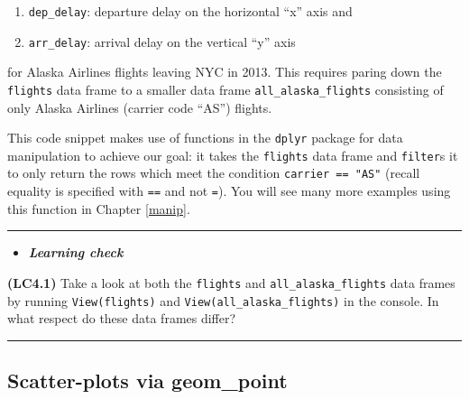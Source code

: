 \documentclass[]{tufte-book}
\newenvironment{Shaded}{\begin{snugshade}}{\end{snugshade}}
\newcommand{\KeywordTok}[1]{\textcolor[rgb]{0.13,0.29,0.53}{\textbf{{#1}}}}
\newcommand{\StringTok}[1]{\textcolor[rgb]{0.31,0.60,0.02}{{#1}}}
\newcommand{\NormalTok}[1]{{#1}}
\let\oldrule=\rule
\renewcommand{\rule}[1]{\oldrule{\linewidth}}
\providecommand{\tightlist}{%
  \setlength{\itemsep}{0pt}\setlength{\parskip}{0pt}}
\newenvironment{rmdblock}[1]
  {\begin{shaded*}
  \begin{itemize}
  \renewcommand{\labelitemi}{
    \raisebox{-.7\height}[0pt][0pt]{
    }
  }
  \item
  }
  {
  \end{itemize}
  \end{shaded*}
  }
\newenvironment{learncheck}
  {\begin{rmdblock}{warning}}
  {\end{rmdblock}}
\theoremstyle{definition}
\theoremstyle{definition}
\theoremstyle{remark}
\begin{document}
\begin{enumerate}
\def\labelenumi{\arabic{enumi}.}
\tightlist
\item
  \texttt{dep\_delay}: departure delay on the horizontal ``x'' axis and
\item
  \texttt{arr\_delay}: arrival delay on the vertical ``y'' axis
\end{enumerate}

for Alaska Airlines flights leaving NYC in 2013. This requires paring
down the \texttt{flights} data frame to a smaller data frame
\texttt{all\_alaska\_flights} consisting of only Alaska Airlines
(carrier code ``AS'') flights.

\begin{Shaded}
\end{Shaded}

This code snippet makes use of functions in the \texttt{dplyr} package
for data manipulation to achieve our goal: it takes the \texttt{flights}
data frame and \texttt{filter}s it to only return the rows which meet
the condition \texttt{carrier\ ==\ "AS"} (recall equality is specified
with \texttt{==} and not \texttt{=}). You will see many more examples
using this function in Chapter \ref{manip}.

\begin{center}\rule{0.5\linewidth}{\linethickness}\end{center}

\begin{learncheck}
\textbf{\emph{Learning check}}
\end{learncheck}

\textbf{(LC4.1)} Take a look at both the \texttt{flights} and
\texttt{all\_alaska\_flights} data frames by running
\texttt{View(flights)} and \texttt{View(all\_alaska\_flights)} in the
console. In what respect do these data frames differ?

\begin{center}\rule{0.5\linewidth}{\linethickness}\end{center}

\subsection{Scatter-plots via geom\_point}\label{geompoint}
\end{document}
